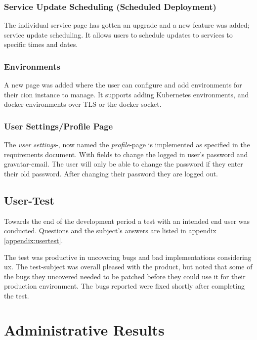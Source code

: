 \subsubsection{Service Update Scheduling (Scheduled Deployment)}
The individual service page has gotten an upgrade and a new feature was added; service update scheduling. It allows users to schedule updates to services to specific times and dates.


\subsubsection{Environments}
A new page was added where the user can configure and add environments for their cion instance to manage. It supports adding Kubernetes environments, and docker environments over TLS or the docker socket.


\subsubsection{User Settings/Profile Page}
The \textit{user settings}-, now named the \textit{profile}-page is implemented as specified in the requirements document. With fields to change the logged in user's password and gravatar-email. The user will only be able to change the password if they enter their old password. After changing their password they are logged out.


\subsection{User-Test}
Towards the end of the development period a test with an intended end user was conducted. Questions and the subject's answers are listed in appendix \ref{appendix:usertest}.

The test was productive in uncovering bugs and bad implementations considering \acrfull{ux}. The test-subject was overall pleased with the product, but noted that some of the bugs they uncovered needed to be patched before they could use it for their production environment. The bugs reported were fixed shortly after completing the test.


\section{Administrative Results}
